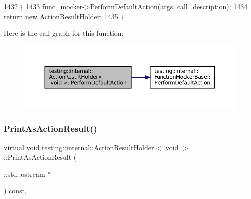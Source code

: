 \begin{DoxyCode}
1432                                       \{
1433     func\_mocker->PerformDefaultAction(\hyperlink{namespacegenerate__debs_a75f9143e38df82d83b2e8a6f99cae02c}{args}, call\_description);
1434     \textcolor{keywordflow}{return} \textcolor{keyword}{new} \hyperlink{classtesting_1_1internal_1_1ActionResultHolder_3_01void_01_4_a4f721cbdde35fde62920fd2495dc55d3}{ActionResultHolder};
1435   \}
\end{DoxyCode}
Here is the call graph for this function\+:
\nopagebreak
\begin{figure}[H]
\begin{center}
\leavevmode
\includegraphics[width=350pt]{classtesting_1_1internal_1_1ActionResultHolder_3_01void_01_4_a140b6ab6a756e60db62e76b01b09a26f_cgraph}
\end{center}
\end{figure}
\mbox{\label{classtesting_1_1internal_1_1ActionResultHolder_3_01void_01_4_ab829399d5a7d6fc9f0ecde0c0a6a3aeb}} 
\subsubsection{\texorpdfstring{Print\+As\+Action\+Result()}{PrintAsActionResult()}}
{\footnotesize\ttfamily virtual void \hyperlink{classtesting_1_1internal_1_1ActionResultHolder}{testing\+::internal\+::\+Action\+Result\+Holder}$<$ void $>$\+::Print\+As\+Action\+Result (\begin{DoxyParamCaption}\item[{\+::std\+::ostream $\ast$}]{ }\end{DoxyParamCaption}) const\hspace{0.3cm}{\ttfamily [inline]}, {\ttfamily [virtual]}}



